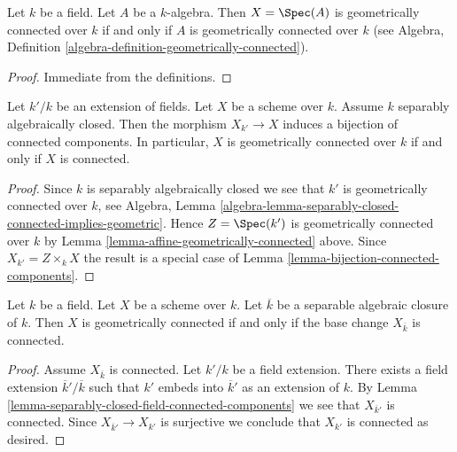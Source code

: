 \begin{lemma}
\label{lemma-affine-geometrically-connected}
Let $k$ be a field.
Let $A$ be a $k$-algebra.
Then $X = \Spec(A)$ is geometrically connected over $k$
if and only if $A$ is geometrically connected over $k$ (see
Algebra, Definition \ref{algebra-definition-geometrically-connected}).
\end{lemma}

\begin{proof}
Immediate from the definitions.
\end{proof}

\begin{lemma}
\label{lemma-separably-closed-field-connected-components}
Let $k'/k$ be an extension of fields.
Let $X$ be a scheme over $k$.
Assume $k$ separably algebraically closed.
Then the morphism $X_{k'} \to X$ induces a bijection of connected
components. In particular, $X$ is geometrically connected over $k$
if and only if $X$ is connected.
\end{lemma}

\begin{proof}
Since $k$ is separably algebraically closed we see that
$k'$ is geometrically connected over $k$, see
Algebra,
Lemma \ref{algebra-lemma-separably-closed-connected-implies-geometric}.
Hence $Z = \Spec(k')$ is geometrically connected over $k$ by
Lemma \ref{lemma-affine-geometrically-connected}
above. Since $X_{k'} = Z \times_k X$ the result is a special case of
Lemma \ref{lemma-bijection-connected-components}.
\end{proof}

\begin{lemma}
\label{lemma-characterize-geometrically-connected}
Let $k$ be a field.
Let $X$ be a scheme over $k$.
Let $\overline{k}$ be a separable algebraic closure of $k$.
Then $X$ is geometrically connected if and only if the base change
$X_{\overline{k}}$ is connected.
\end{lemma}

\begin{proof}
Assume $X_{\overline{k}}$ is connected.
Let $k'/k$ be a field extension.
There exists a field extension $\overline{k}'/\overline{k}$
such that $k'$ embeds into $\overline{k}'$ as an extension of $k$.
By Lemma \ref{lemma-separably-closed-field-connected-components}
we see that $X_{\overline{k}'}$ is connected.
Since $X_{\overline{k}'} \to X_{k'}$ is surjective we conclude
that $X_{k'}$ is connected as desired.
\end{proof}

